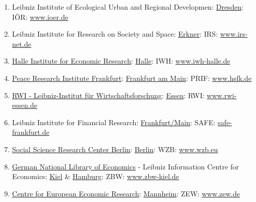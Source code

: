 \documentclass{book}
\numberwithin{equation}{section}
\begin{document}
\begin{enumerate}
    \item Leibniz Institute of Ecological Urban and Regional Developmen: \href{https://en.wikipedia.org/wiki/Dresden}{Dresden}: IÖR: \url{www.ioer.de}
    \item Leibniz Institute for Research on Society and Space: \href{https://en.wikipedia.org/wiki/Erkner}{Erkner}: IRS: \url{www.irs-net.de}
    \item \href{https://en.wikipedia.org/wiki/Halle_Institute_for_Economic_Research}{Halle Institute for Economic Research}: \href{https://en.wikipedia.org/wiki/Halle,_Saxony-Anhalt}{Halle}: IWH: \url{www.iwh-halle.de}
    \item \href{https://en.wikipedia.org/wiki/Peace_Research_Institute_Frankfurt}{Peace Research Institute Frankfurt}: \href{https://en.wikipedia.org/wiki/Frankfurt_am_Main}{Frankfurt am Main}: PRIF: \url{www.hsfk.de}
    \item \href{https://en.wikipedia.org/wiki/RWI_Essen}{RWI - Leibniz-Institut für Wirtschaftsforschung}: \href{https://en.wikipedia.org/wiki/Essen}{Essen}: RWI: \url{www.rwi-essen.de}
    \item Leibniz Institute for Financial Research: \href{https://en.wikipedia.org/wiki/Frankfurt/Main}{Frankfurt/Main}: SAFE: \url{safe-frankfurt.de}
    \item \href{https://en.wikipedia.org/wiki/Social_Science_Research_Center_Berlin}{Social Science Research Center Berlin}: \href{https://en.wikipedia.org/wiki/Berlin}{Berlin}: WZB: \url{www.wzb.eu}
    \item \href{https://en.wikipedia.org/wiki/German_National_Library_of_Economics}{German National Library of Economics} - Leibniz Information Centre for Economics: \href{https://en.wikipedia.org/wiki/Kiel}{Kiel} \& \href{https://en.wikipedia.org/wiki/Hamburg}{Hamburg}: ZBW: \url{www.zbw-kiel.de}
    \item \href{https://en.wikipedia.org/wiki/Zentrum_f%C3%BCr_europ%C3%A4ische_Wirtschaftsforschung}{Centre for European Economic Research}: \href{https://en.wikipedia.org/wiki/Mannheim}{Mannheim}: ZEW: \url{www.zew.de}
\end{enumerate}
\end{document}
